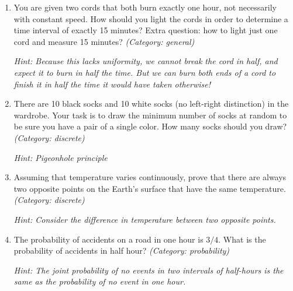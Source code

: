 \begin{enumerate}
\item You are given two cords that both burn exactly one hour, not necessarily with constant speed. How should you light the cords in order to determine a time interval of exactly 15 minutes? Extra question: how to light just one cord and measure 15 minutes?
\small\emph{(Category: general)}

\small\emph{Hint: Because this lacks uniformity, we cannot break the cord in half, and expect it to burn in half the time. But we can burn both ends of a cord to finish it in half the time it would have taken otherwise!}





\item There are 10 black socks and 10 white socks (no left-right distinction) in the wardrobe. Your task is to draw the minimum number of socks at random to be sure you have a pair of a single color. How many socks should you draw?
\small\emph{(Category: discrete)}

\small\emph{Hint: Pigeonhole principle}





\item Assuming that temperature varies continuously, prove that there are always two opposite points on the Earth's surface that have the same temperature.
\small\emph{(Category: discrete)}

\small\emph{Hint: Consider the difference in temperature between two opposite points.}





\item The probability of accidents on a road in one hour is $3/4$. What is the probability of accidents in half hour?
\small\emph{(Category: probability)}

\small\emph{Hint: The joint probability of no events in two intervals of half-hours is the same as the probability of no event in one hour.}


\end{enumerate}
